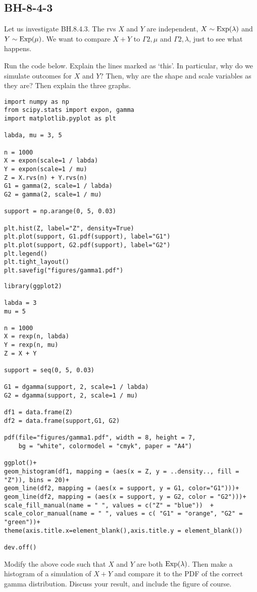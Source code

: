 \subsection{BH-8-4-3}
\label{sec:sum-two-gamma}

Let us investigate BH.8.4.3. The rvs $X$ and $Y$ are independent, $X\sim\mathrm{Exp}(\lambda)$ and $Y\sim\mathrm{Exp}(\mu)$. We want to compare $X+Y$ to $\Gamma{2, \mu}$ and $\Gamma{2, \lambda}$, just to see what happens.

\begin{exercise}
Run the  code below. Explain the lines marked as `this'. In particular, why do we simulate outcomes for $X$ and $Y$? Then, why are the shape and scale variables as they are? Then explain the three graphs.
\begin{verbatim}
import numpy as np
from scipy.stats import expon, gamma
import matplotlib.pyplot as plt

labda, mu = 3, 5

n = 1000
X = expon(scale=1 / labda)
Y = expon(scale=1 / mu)
Z = X.rvs(n) + Y.rvs(n)
G1 = gamma(2, scale=1 / labda)
G2 = gamma(2, scale=1 / mu)

support = np.arange(0, 5, 0.03)

plt.hist(Z, label="Z", density=True)
plt.plot(support, G1.pdf(support), label="G1")
plt.plot(support, G2.pdf(support), label="G2")
plt.legend()
plt.tight_layout()
plt.savefig("figures/gamma1.pdf")
\end{verbatim}

\begin{verbatim}
library(ggplot2)

labda = 3
mu = 5

n = 1000
X = rexp(n, labda)
Y = rexp(n, mu)
Z = X + Y

support = seq(0, 5, 0.03)

G1 = dgamma(support, 2, scale=1 / labda)
G2 = dgamma(support, 2, scale=1 / mu)

df1 = data.frame(Z)
df2 = data.frame(support,G1, G2)

pdf(file="figures/gamma1.pdf", width = 8, height = 7,
    bg = "white", colormodel = "cmyk", paper = "A4")

ggplot()+
geom_histogram(df1, mapping = (aes(x = Z, y = ..density.., fill = "Z")), bins = 20)+
geom_line(df2, mapping = (aes(x = support, y = G1, color="G1")))+
geom_line(df2, mapping = (aes(x = support, y = G2, color = "G2")))+
scale_fill_manual(name = " ", values = c("Z" = "blue"))  +
scale_color_manual(name = " ", values = c( "G1" = "orange", "G2" = "green"))+
theme(axis.title.x=element_blank(),axis.title.y = element_blank())

dev.off()
\end{verbatim}
\end{exercise}

\begin{exercise}
Modify the above code such that $X$ and $Y$ are both $\mathrm{Exp}(\lambda)$. Then make a histogram of a simulation of $X+Y$ and compare it to the PDF of the correct gamma  distribution. Discuss your result, and include the figure of course.
\end{exercise}
